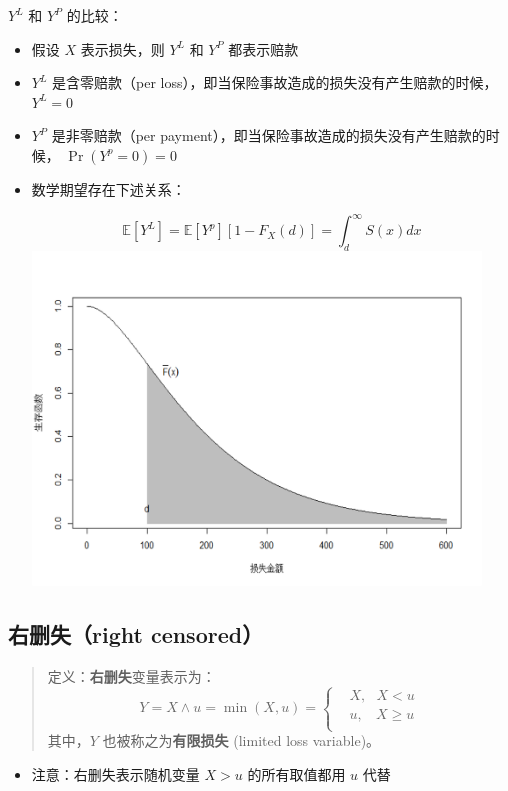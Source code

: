 \documentclass[
]{book}
\providecommand{\tightlist}{%
  \setlength{\itemsep}{0pt}\setlength{\parskip}{0pt}}
\begin{document}
\(Y^L\) 和 \(Y^P\) 的比较：

\begin{itemize}
\item
  假设 \(X\) 表示损失，则 \(Y^L\) 和 \(Y^P\) 都表示赔款
\item
  \(Y^L\) 是含零赔款（per loss），即当保险事故造成的损失没有产生赔款的时候， \(Y^L=0\)
\item
  \(Y^P\) 是非零赔款（per payment），即当保险事故造成的损失没有产生赔款的时候， \(\Pr(Y^p=0)=0\)
\item
  数学期望存在下述关系：

  \[\mathbb{E}[Y^L]=\mathbb{E}[Y^p][1-F_X(d)]=\int_{d}^{\infty}S(x)dx\]
  \includegraphics[width=4.6875in,height=\textheight]{picture/YL.png}
\end{itemize}

\hypertarget{ux53f3ux5220ux5931right-censored}{%
\subsection{右删失（right censored）}\label{ux53f3ux5220ux5931right-censored}}

\begin{quote}
定义：\textbf{右删失}变量表示为：
\[
Y=X\wedge u=\min (X,u)=\begin{cases}
& X,\ \ \ X<u \\ 
& u,\ \ \ \ X\ge u \\ 
\end{cases}
\]
其中，\(Y\) 也被称之为\textbf{有限损失} (limited loss variable)。
\end{quote}

\begin{itemize}
\tightlist
\item
  注意：右删失表示随机变量 \(X>u\) 的所有取值都用 \(u\) 代替
\end{itemize}
\end{document}
